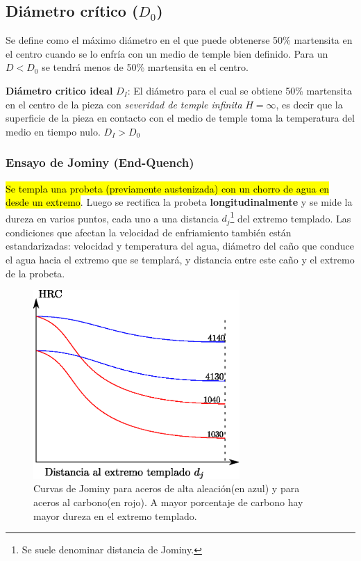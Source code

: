 \documentclass{article}
\begin{document}
\setcounter{footnote}{0}

\subsection[Diámetro crítico]{Diámetro crítico ($D_0$)}
 Se define como el máximo diámetro en el que puede obtenerse 50\% martensita en el centro cuando se lo enfría con un medio de temple bien definido. Para un $D<D_0$ se tendrá menos de 50\% martensita en el centro.

\textbf{Diámetro critico ideal} $D_{I}$: El diámetro para el cual se obtiene 50\% martensita en el centro de la pieza con \textit{severidad de temple infinita} $H=\infty$, es decir que la superficie de la pieza en contacto con el medio de temple toma la temperatura del medio en tiempo nulo. $D_{I}>D_0$

\subsubsection{Ensayo de Jominy (End-Quench)}
\hl{Se templa una probeta (previamente austenizada) con un chorro de agua en desde un extremo}. Luego se rectifica la probeta \textbf{longitudinalmente} y se mide la dureza en varios puntos, cada uno a una distancia $d_j$\footnote{Se suele denominar distancia de Jominy.} del extremo templado. Las condiciones que afectan la velocidad de enfriamiento también están estandarizadas: velocidad y temperatura del agua, diámetro del caño que conduce el agua hacia el extremo que se templará, y distancia entre este caño y el extremo de la probeta.

\begin{figure}[htb!]
    \centering
    \includegraphics[width=0.7\textwidth]{fig/jominy.eps}
    \caption{Curvas de Jominy para aceros de alta aleación(en {\color{blue} azul}) y para aceros al carbono(en {\color{red} rojo}). A mayor porcentaje de carbono hay mayor dureza en el extremo templado.}
    \label{fig:jominy}
\end{figure}
\end{document}
